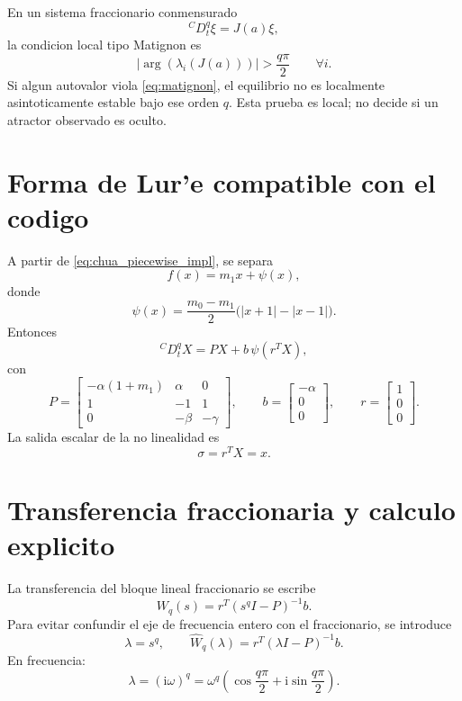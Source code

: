 \documentclass[11pt]{article}
\newcommand{\CaputoD}{{}^{C}D_t^q}
\newcommand{\ii}{\mathrm{i}}
\begin{document}
En un sistema fraccionario conmensurado
\[
\CaputoD \xi = J(a)\xi,
\]
la condicion local tipo Matignon es
\begin{equation}
\label{eq:matignon}
|\arg(\lambda_i(J(a)))|>\frac{q\pi}{2}
\qquad
\forall i.
\end{equation}
Si algun autovalor viola \eqref{eq:matignon}, el equilibrio no es localmente
asintoticamente estable bajo ese orden \(q\). Esta prueba es local; no decide
si un atractor observado es oculto.

\section{Forma de Lur'e compatible con el codigo}

A partir de \eqref{eq:chua_piecewise_impl}, se separa
\[
f(x)=m_1x+\psi(x),
\]
donde
\begin{equation}
\label{eq:psi_chua_lure}
\psi(x)=\frac{m_0-m_1}{2}\bigl(|x+1|-|x-1|\bigr).
\end{equation}
Entonces
\[
\CaputoD X = PX+b\,\psi(r^TX),
\]
con
\begin{equation}
\label{eq:Pbr_lure}
P=
\begin{bmatrix}
-\alpha(1+m_1)&\alpha&0\\
1&-1&1\\
0&-\beta&-\gamma
\end{bmatrix},
\qquad
b=
\begin{bmatrix}
-\alpha\\0\\0
\end{bmatrix},
\qquad
r=
\begin{bmatrix}
1\\0\\0
\end{bmatrix}.
\end{equation}
La salida escalar de la no linealidad es
\[
\sigma=r^T X=x.
\]

\section{Transferencia fraccionaria y calculo explicito}

La transferencia del bloque lineal fraccionario se escribe
\begin{equation}
\label{eq:Wq}
W_q(s)=r^T(s^qI-P)^{-1}b.
\end{equation}
Para evitar confundir el eje de frecuencia entero con el fraccionario, se
introduce
\[
\lambda=s^q,
\qquad
\widehat W_q(\lambda)=r^T(\lambda I-P)^{-1}b.
\]
En frecuencia:
\begin{equation}
\label{eq:lambda_fractional_frequency}
\lambda=(\ii\omega)^q
=\omega^q\left(
\cos\frac{q\pi}{2}
+\ii\sin\frac{q\pi}{2}
\right).
\end{equation}
\end{document}
